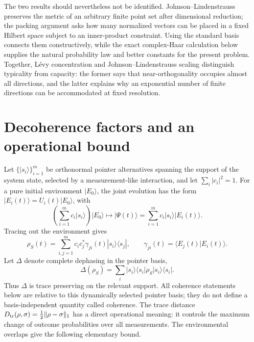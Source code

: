 \documentclass[aps,pra,reprint,superscriptaddress,nofootinbib,longbibliography]{revtex4-2}
\newcommand{\bra}[1]{\langle #1 |}
\newcommand{\ket}[1]{| #1 \rangle}
\newcommand{\braket}[2]{\langle #1 | #2 \rangle}
\begin{document}
The two results should nevertheless not be identified.  Johnson--Lindenstrauss
preserves the metric of an arbitrary finite point set after dimensional
reduction; the packing argument asks how many normalized vectors can be
placed in a fixed Hilbert space subject to an inner-product constraint.
Using the standard basis connects them constructively, while the exact
complex-Haar calculation below supplies the natural probability law and
better constants for the present problem.  Together, L\'evy concentration
and Johnson--Lindenstrauss scaling distinguish typicality from capacity:
the former says that near-orthogonality occupies almost all directions, and
the latter explains why an exponential number of finite directions can be
accommodated at fixed resolution.

\section{Decoherence factors and an operational bound}
\label{sec:operational}

Let $\{\ket{s_i}\}_{i=1}^{m}$ be orthonormal pointer alternatives spanning
the support of the system state, selected by a measurement-like interaction,
and let $\sum_i|c_i|^2=1$.  For a pure initial environment $\ket{E_0}$,
the joint evolution has the form $\ket{E_i(t)}=U_i(t)\ket{E_0}$, with
\begin{equation}
 \left(\sum_{i=1}^{m}c_i\ket{s_i}\right)\ket{E_0}
 \longmapsto
 \ket{\Psi(t)}=
 \sum_{i=1}^{m}c_i\ket{s_i}\ket{E_i(t)}
.
 \label{eq:branching}
\end{equation}
Tracing out the environment gives
\begin{equation}
 \rho_S(t)=
 \sum_{i,j=1}^{m}c_ic_j^*\gamma_{ji}(t)
 \ket{s_i}\bra{s_j},
 \qquad
 \gamma_{ji}(t)=\braket{E_j(t)}{E_i(t)}.
 \label{eq:reduced}
\end{equation}
Let $\Delta$ denote complete dephasing in the pointer basis,
\begin{equation}
 \Delta(\rho_S)=\sum_i\ket{s_i}\bra{s_i}\rho_S
 \ket{s_i}\bra{s_i}.
\end{equation}
Thus $\Delta$ is trace preserving on the relevant support.  All coherence
statements below are relative to this dynamically selected pointer basis;
they do not define a basis-independent quantity called coherence.
The trace distance
$D_{\rm tr}(\rho,\sigma)=\frac12\|\rho-\sigma\|_1$ has a direct operational
meaning: it controls the maximum change of outcome probabilities over all
measurements.  The environmental overlaps give the following elementary
bound.
\end{document}
